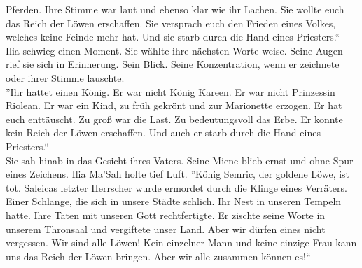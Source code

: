 Pferden. Ihre Stimme war laut und ebenso klar wie ihr Lachen. Sie wollte euch das Reich der Löwen 
erschaffen. Sie versprach euch den Frieden eines Volkes, welches keine Feinde mehr hat. Und sie 
starb durch die Hand eines Priesters.``\\
Ilia schwieg einen Moment. Sie wählte ihre nächsten Worte weise. Seine Augen rief sie sich in 
Erinnerung. Sein Blick. Seine Konzentration, wenn er zeichnete oder ihrer Stimme lauschte.\\
''Ihr hattet einen König. Er war nicht König Kareen. Er war nicht Prinzessin Riolean. Er war ein 
Kind, zu früh gekrönt und zur Marionette erzogen. Er hat euch enttäuscht. Zu groß war die Last. Zu 
bedeutungsvoll das Erbe. Er konnte kein Reich der Löwen erschaffen. Und auch er starb durch die 
Hand eines Priesters.``\\
Sie sah hinab in das Gesicht ihres Vaters. Seine Miene blieb ernst und ohne Spur eines Zeichens. 
Ilia Ma'Sah holte tief Luft. ''König Semric, der goldene Löwe, ist tot. Saleicas letzter Herrscher 
wurde ermordet durch die Klinge eines Verräters. Einer Schlange, die sich in unsere Städte 
schlich. Ihr Nest in unseren Tempeln hatte. Ihre Taten mit unseren Gott rechtfertigte. Er 
zischte seine Worte in unserem Thronsaal und vergiftete unser Land. Aber wir dürfen eines 
nicht vergessen. Wir sind alle Löwen! Kein einzelner Mann und keine einzige Frau kann uns das Reich 
der Löwen bringen. Aber wir alle zusammen können es!``\\

